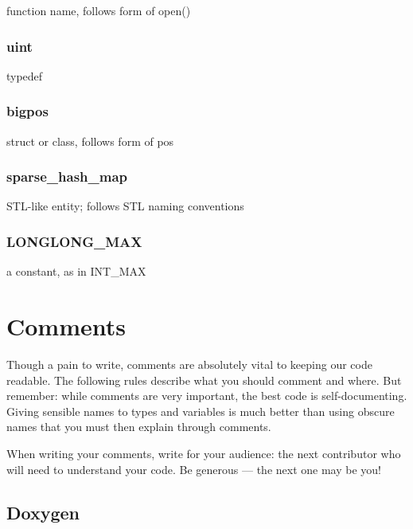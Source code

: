 function name, follows form of open()

\subsubsection*{{\ttfamily uint}}

typedef

\subsubsection*{{\ttfamily bigpos}}

struct or class, follows form of pos

\subsubsection*{{\ttfamily sparse\+\_\+hash\+\_\+map}}

S\+T\+L-\/like entity; follows S\+TL naming conventions

\subsubsection*{{\ttfamily L\+O\+N\+G\+L\+O\+N\+G\+\_\+\+M\+AX}}

a constant, as in I\+N\+T\+\_\+\+M\+AX

\section*{Comments}

Though a pain to write, comments are absolutely vital to keeping our code readable. The following rules describe what you should comment and where. But remember\+: while comments are very important, the best code is self-\/documenting. Giving sensible names to types and variables is much better than using obscure names that you must then explain through comments.

When writing your comments, write for your audience\+: the next contributor who will need to understand your code. Be generous — the next one may be you!

\subsection*{Doxygen}


